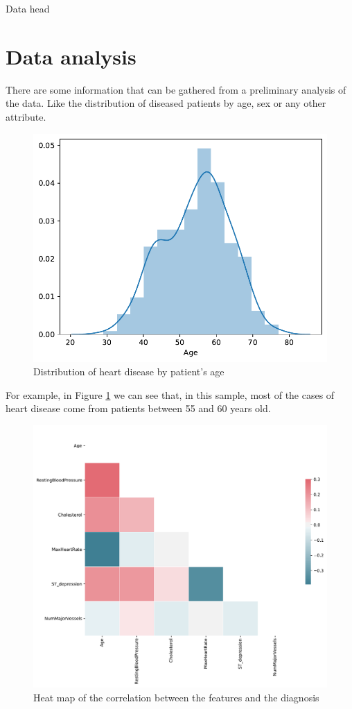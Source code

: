 \documentclass[conference]{IEEEtran}
\begin{document}
\begin{table}[htbp]
    \caption{Data head}
    \begin{center}
        \resizebox{\columnwidth}{!}{%
            
        }%
        \label{data_head}
    \end{center}
\end{table}

\section{Data analysis}

There are some information that can be gathered from a preliminary analysis of the data. Like the distribution of diseased patients by age, sex or any other attribute.

\begin{figure}[htbp]
    \centerline{\includegraphics[width=0.7\linewidth]{images/age_distribution.pdf}}
    \caption{Distribution of heart disease by patient's age}
    \label{age_dist}
\end{figure}

For example, in Figure \ref{age_dist} we can see that, in this sample, most of the cases of heart disease come from patients between 55 and 60 years old.

\begin{figure}[H]
    \centerline{\includegraphics[width=0.7\linewidth]{images/correlation_heatmap.pdf}}
    \caption{Heat map of the correlation between the features and the diagnosis}
    \label{corr_heatmap}
\end{figure}
\end{document}
